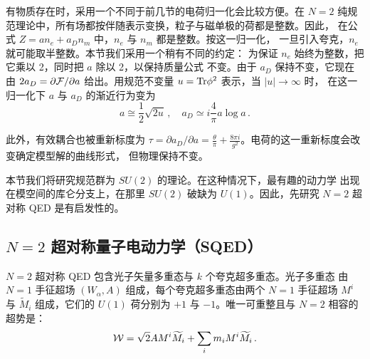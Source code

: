 
有物质存在时，采用一个不同于前几节的电荷归一化会比较方便。在 $N=2$
纯规范理论中，所有场都按伴随表示变换，粒子与磁单极的荷都是整数。因此，
在公式 $Z=a n_e + a_D n_m$ 中，$n_e$ 与 $n_m$ 都是整数。按这一归一化，
一旦引入夸克，$n_e$ 就可能取半整数。本节我们采用一个稍有不同的约定：
为保证 $n_e$ 始终为整数，把它乘以 2，同时把 $a$ 除以 2，以保持质量公式
不变。由于 $a_D$ 保持不变，它现在由 $2 a_D=\partial{\cal F}/\partial a$
给出。用规范不变量 $u={\rm Tr}\phi^2$ 表示，当 $|u|\rightarrow\infty$ 时，
在这一归一化下 $a$ 与 $a_D$ 的渐近行为变为
$$
a \cong \frac{1}{2} \sqrt{2u}\,, \quad
a_D \simeq i \frac{4}{\pi} a \log a\,.
$$


此外，有效耦合也被重新标度为 $\tau=\partial a_D/\partial a = \frac{\theta}{\pi}
+ \frac{8 \pi i}{g^2}$。电荷的这一重新标度会改变确定模型解的曲线形式，
但物理保持不变。

本节我们将研究规范群为 $SU(2)$ 的理论。在这种情况下，最有趣的动力学
出现在模空间的库仑分支上，在那里 $SU(2)$ 破缺为 $U(1)$。因此，先研究
$N = 2$ 超对称 QED 是有启发性的。

\subsection{$N = 2$ 超对称量子电动力学（SQED）}

$N=2$ 超对称 QED 包含光子矢量多重态与 $k$ 个夸克超多重态。光子多重态
由 $N=1$ 手征超场 $(W_{\alpha}, A)$ 组成，每个夸克超多重态由两个 $N=1$
手征超场 $M^i$ 与 $\widetilde M_i$ 组成，它们的 $U(1)$ 荷分别为 $+1$ 与
$-1$。唯一可重整且与 $N = 2$ 相容的超势是：
$$
{\cal W}=\sqrt{2} A M^i\widetilde M_i + \sum_i m_i M^i\widetilde
M_i\,. 
$$


